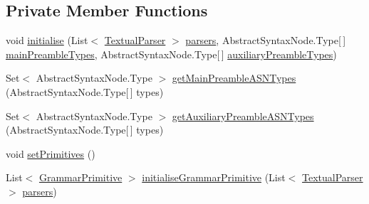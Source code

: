 \subsection*{Private Member Functions}
\begin{DoxyCompactItemize}
\item 
void \hyperlink{classit_1_1emarolab_1_1cagg_1_1core_1_1evaluation_1_1semanticGrammar_1_1syntaxCompiler_1_1Gramma1bf252c3f4def91ad707660fdfe73d0a_a4b35057ca51d7548c4689fe3a7f4404b}{initialise} (List$<$ \hyperlink{classit_1_1emarolab_1_1cagg_1_1core_1_1language_1_1parser_1_1TextualParser}{Textual\-Parser} $>$ \hyperlink{classit_1_1emarolab_1_1cagg_1_1core_1_1evaluation_1_1semanticGrammar_1_1syntaxCompiler_1_1Gramma1bf252c3f4def91ad707660fdfe73d0a_a7590d69339977f1793a7d9444820705f}{parsers}, Abstract\-Syntax\-Node.\-Type\mbox{[}$\,$\mbox{]} \hyperlink{classit_1_1emarolab_1_1cagg_1_1core_1_1evaluation_1_1semanticGrammar_1_1syntaxCompiler_1_1Gramma1bf252c3f4def91ad707660fdfe73d0a_a88e2ddf73b39f0887fd24af0a04847d2}{main\-Preamble\-Types}, Abstract\-Syntax\-Node.\-Type\mbox{[}$\,$\mbox{]} \hyperlink{classit_1_1emarolab_1_1cagg_1_1core_1_1evaluation_1_1semanticGrammar_1_1syntaxCompiler_1_1Gramma1bf252c3f4def91ad707660fdfe73d0a_a7f7318940cd05510c4f250487bba5142}{auxiliary\-Preamble\-Types})
\item 
Set$<$ Abstract\-Syntax\-Node.\-Type $>$ \hyperlink{classit_1_1emarolab_1_1cagg_1_1core_1_1evaluation_1_1semanticGrammar_1_1syntaxCompiler_1_1Gramma1bf252c3f4def91ad707660fdfe73d0a_a63626d6cd7aa722f23add6e9a8c729f8}{get\-Main\-Preamble\-A\-S\-N\-Types} (Abstract\-Syntax\-Node.\-Type\mbox{[}$\,$\mbox{]} types)
\item 
Set$<$ Abstract\-Syntax\-Node.\-Type $>$ \hyperlink{classit_1_1emarolab_1_1cagg_1_1core_1_1evaluation_1_1semanticGrammar_1_1syntaxCompiler_1_1Gramma1bf252c3f4def91ad707660fdfe73d0a_ac6fde11355928e5067ffd5354ce41799}{get\-Auxiliary\-Preamble\-A\-S\-N\-Types} (Abstract\-Syntax\-Node.\-Type\mbox{[}$\,$\mbox{]} types)
\item 
void \hyperlink{classit_1_1emarolab_1_1cagg_1_1core_1_1evaluation_1_1semanticGrammar_1_1syntaxCompiler_1_1Gramma1bf252c3f4def91ad707660fdfe73d0a_a86da834a75e4b8e91afe2614b8498602}{set\-Primitives} ()
\item 
List$<$ \hyperlink{classit_1_1emarolab_1_1cagg_1_1core_1_1language_1_1syntax_1_1GrammarPrimitive}{Grammar\-Primitive} $>$ \hyperlink{classit_1_1emarolab_1_1cagg_1_1core_1_1evaluation_1_1semanticGrammar_1_1syntaxCompiler_1_1Gramma1bf252c3f4def91ad707660fdfe73d0a_a8712d8d8bd7865fd20adecffc5fa8dc8}{initialise\-Grammar\-Primitive} (List$<$ \hyperlink{classit_1_1emarolab_1_1cagg_1_1core_1_1language_1_1parser_1_1TextualParser}{Textual\-Parser} $>$ \hyperlink{classit_1_1emarolab_1_1cagg_1_1core_1_1evaluation_1_1semanticGrammar_1_1syntaxCompiler_1_1Gramma1bf252c3f4def91ad707660fdfe73d0a_a7590d69339977f1793a7d9444820705f}{parsers})

\end{DoxyCompactItemize}
